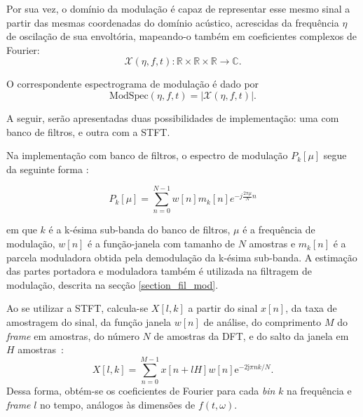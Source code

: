 Por sua vez, o domínio da modulação é capaz de representar esse mesmo sinal a
partir das mesmas coordenadas do domínio acústico, acrescidas da frequência
$\eta$ de oscilação de sua envoltória, mapeando-o também em coeficientes
complexos de Fourier:
\begin{equation}
\mathcal{X}(\eta, f, t): \mathbb{R}  \times \mathbb{R}  \times  \mathbb{R} \rightarrow \mathbb{C}.
\end{equation}

O correspondente espectrograma de modulação é dado por
\begin{equation}
      \mathrm{Mod Spec}(\eta, f, t) = \left\lvert \mathcal{X}(\eta, f, t)\right\rvert.
\end{equation}

A seguir, serão apresentadas duas possibilidades de implementação: uma com banco
de filtros, e outra com a STFT.

Na implementação com banco de filtros, o espectro de modulação $P_k[\mu]$ segue da
seguinte forma \cite{toolbox2010}:

\begin{equation} \label{modspec_filterbank}
    P_k[\mu] = \sum_{n = 0}^{N - 1} w[n]m_k[n] e^{-j \frac{2 \pi \mu}{N} n}
\end{equation}

em que $k$ é a k-ésima sub-banda do banco de filtros, $\mu$ é a frequência de
modulação, $w[n]$ é a função-janela com tamanho de $N$ amostras e $m_k[n]$ é a
parcela moduladora obtida pela demodulação da k-ésima sub-banda. A estimação das
partes portadora e moduladora também é utilizada na filtragem de modulação,
descrita na secção \ref{section_fil_mod}.

Ao se utilizar a STFT, calcula-se $X[l,k]$ a partir do sinal $x[n]$, da taxa de
amostragem do sinal, da função janela $w[n]$ de análise, do comprimento $M$ do
\textit{frame} em amostras, do número $N$ de amostras da DFT, e do salto da janela
em $H$ amostras~\cite{paliwal2015,mauricio}:
 \begin{equation}
      X[l, k] = \sum_{n = 0}^{M-1} x[n + l H] w[n]{\mathrm{e}^{-2\mathrm{j}\pi n k/N}}. 
 \end{equation}
Dessa forma, obtém-se os coeficientes de Fourier para cada \textit{bin} $k$ na
 frequência e \textit{frame} $l$ no tempo, análogos às dimensões de
 $f(t,\omega)$.

